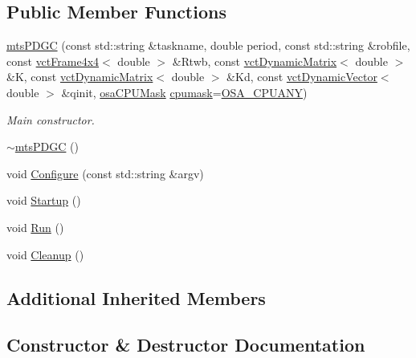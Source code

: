 \subsection*{Public Member Functions}
\begin{DoxyCompactItemize}
\item 
\hyperlink{classmts_p_d_g_c_a468cda6c0b0e19dd3fdcd6666a88db79}{mts\+P\+D\+G\+C} (const std\+::string \&taskname, double period, const std\+::string \&robfile, const \hyperlink{classvct_frame4x4}{vct\+Frame4x4}$<$ double $>$ \&Rtwb, const \hyperlink{classvct_dynamic_matrix}{vct\+Dynamic\+Matrix}$<$ double $>$ \&K, const \hyperlink{classvct_dynamic_matrix}{vct\+Dynamic\+Matrix}$<$ double $>$ \&Kd, const \hyperlink{classvct_dynamic_vector}{vct\+Dynamic\+Vector}$<$ double $>$ \&qinit, \hyperlink{osa_c_p_u_affinity_8h_aaec7cdd7797e5e6eb5438c15fee5477a}{osa\+C\+P\+U\+Mask} \hyperlink{classmts_controller_a3125e5e9b65dc2347725215e8af73c9f}{cpumask}=\hyperlink{osa_c_p_u_affinity_8h_a2ae5ea257830cff2814d81ce526ada35}{O\+S\+A\+\_\+\+C\+P\+U\+A\+N\+Y})
\begin{DoxyCompactList}\small\item\em Main constructor. \end{DoxyCompactList}\item 
\hyperlink{classmts_p_d_g_c_adf227449e5ac7d32ebdbaa56b30c9072}{$\sim$mts\+P\+D\+G\+C} ()
\item 
void \hyperlink{classmts_p_d_g_c_a29675ad41f14e32e3c236625b91dfbea}{Configure} (const std\+::string \&argv)
\item 
void \hyperlink{classmts_p_d_g_c_ac14839761b21dcca78e0823b32942b9c}{Startup} ()
\item 
void \hyperlink{classmts_p_d_g_c_a443cbb3ccb3ae69415b22db66d20c466}{Run} ()
\item 
void \hyperlink{classmts_p_d_g_c_abce1b8e375c7996d32e37054cdd3da3d}{Cleanup} ()
\end{DoxyCompactItemize}
\subsection*{Additional Inherited Members}


\subsection{Constructor \& Destructor Documentation}
\hypertarget{classmts_p_d_g_c_a468cda6c0b0e19dd3fdcd6666a88db79}{}
